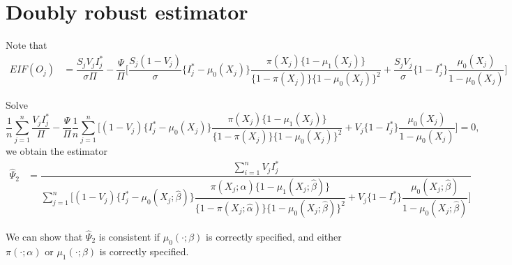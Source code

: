 \documentclass{article}
\begin{document}
\section{Doubly robust estimator}
Note that
\begin{align*}
    EIF(O_j) &=\dfrac{S_jV_j I^*_j}{\sigma \Pi} - \dfrac{\Psi}{\Pi}\bigg[ \dfrac{S_j(1 - V_j)}{\sigma}\{I^*_j - \mu_0(X_j)\}\dfrac{\pi(X_j)\{1 - \mu_1(X_j)\}}{\{1 - \pi(X_j)\}\{1 - \mu_0(X_j)\}^2} + \dfrac{S_jV_j}{\sigma}\{1-I^*_j\}\dfrac{\mu_0(X_j)}{1-\mu_0(X_j)}\bigg] 
\end{align*}

Solve
$$\dfrac{1}{n}\sum_{j=1}^n \dfrac{V_jI^*_j}{\Pi}-\dfrac{\Psi}{\Pi}\dfrac{1}{n}\sum_{j=1}^n\bigg[ (1-V_j)\{I^*_j - \mu_0(X_j)\}\dfrac{\pi(X_j)\{1 - \mu_1(X_j)\}}{\{1 - \pi(X_j)\}\{1 - \mu_0(X_j)\}^2} + V_j\{1-I^*_j\}\dfrac{\mu_0(X_j)}{1-\mu_0(X_j)}\bigg]=0,$$
we obtain the estimator 
\begin{align*}
\hat\Psi_2&= \dfrac{\sum_{i=1}^n V_jI_j^*}{\sum_{j=1}^n\bigg[ (1-V_j)\{I^*_j - \mu_0(X_j;\hat\beta)\}\dfrac{\pi(X_j;\hat\alpha)\{1 - \mu_1(X_j;\hat\beta)\}}{\{1 - \pi(X_j;\hat\alpha)\}\{1 - \mu_0(X_j;\hat\beta)\}^2} + V_j\{1-I^*_j\}\dfrac{\mu_0(X_j;\hat\beta)}{1-\mu_0(X_j;\hat\beta)}\bigg]}
\end{align*}

We can show that $\hat\Psi_2$ is consistent if $\mu_0(\cdot;\beta)$ is correctly specified, and either $\pi(\cdot;\alpha)$ or $\mu_1(\cdot;\beta)$ is correctly specified. 
\end{document}
